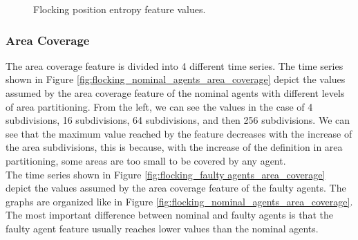 \documentclass[../../Thesis.tex]{subfiles}
\begin{document}
\begin{figure}
{					}
					\caption{Flocking position entropy feature values.}
					\label{fig:flocking_position_entropy}
				\end{figure}
			
			\subsubsection{Area Coverage}
			\label{sec:flocking_area_coverage} %
				The area coverage feature is divided into 4 different time series. The time series shown in Figure \ref{fig:flocking_nominal_agents_area_coverage} depict the values assumed by the area coverage feature of the nominal agents with different levels of area partitioning. From the left, we can see the values in the case of 4 subdivisions, 16 subdivisions, 64 subdivisions, and then 256 subdivisions. We can see that the maximum value reached by the feature decreases with the increase of the area subdivisions, this is because, with the increase of the definition in area partitioning, some areas are too small to be covered by any agent.\\
				The time series shown in Figure \ref{fig:flocking_faulty agents_area_coverage} depict the values assumed by the area coverage feature of the faulty agents.  The graphs are organized like in Figure \ref{fig:flocking_nominal_agents_area_coverage}. The most important difference between nominal and faulty agents is that the faulty agent feature usually reaches lower values than the nominal agents.
\end{document}
